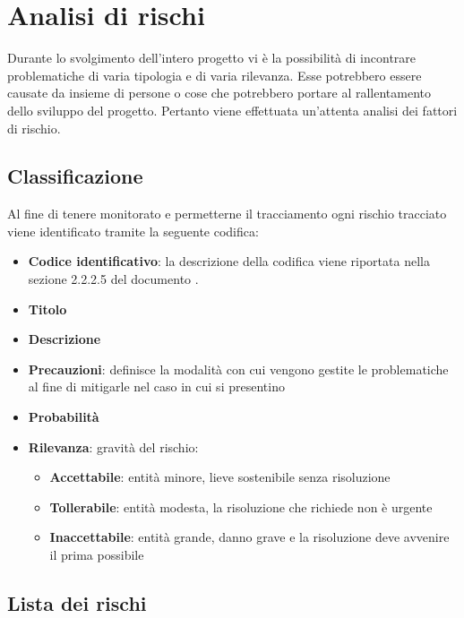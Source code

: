 \section{Analisi di rischi}

Durante lo svolgimento dell’intero progetto vi è la possibilità di incontrare problematiche di varia tipologia e di varia rilevanza. 
Esse potrebbero essere causate da insieme di persone o cose che potrebbero portare al rallentamento dello sviluppo del progetto. 
Pertanto viene effettuata un'attenta analisi dei fattori di rischio. 

\subsection{Classificazione}
Al fine di tenere monitorato e permetterne il tracciamento ogni  rischio tracciato viene identificato tramite la seguente codifica:
\begin{itemize}
    \item \textbf{Codice identificativo}: la descrizione della codifica viene riportata nella sezione 2.2.2.5 del documento \NdPdocumento.
    \item \textbf{Titolo}
    \item \textbf{Descrizione}
    \item \textbf{Precauzioni}: definisce la modalità con cui vengono gestite le problematiche al fine di mitigarle nel caso in cui si presentino
    \item \textbf{Probabilità}
    \item \textbf{Rilevanza}: gravità del rischio:
    \begin{itemize}
        \item \textbf{Accettabile}: entità minore, lieve sostenibile senza risoluzione
        \item \textbf{Tollerabile}: entità modesta, la risoluzione che richiede non è urgente
        \item \textbf{Inaccettabile}: entità grande, danno grave e la risoluzione deve avvenire il prima possibile
    \end{itemize}
\end{itemize}

\subsection{Lista dei rischi}

